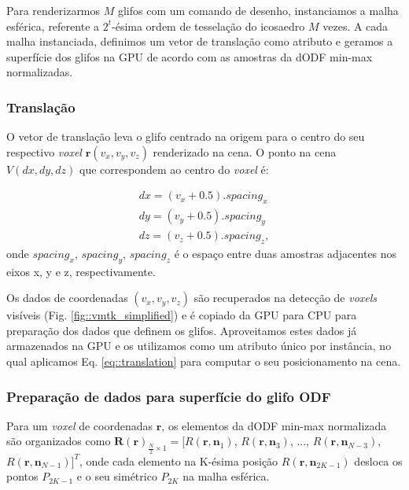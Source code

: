 Para renderizarmos $M$ glifos com um comando de desenho, instanciamos a malha esférica, referente a $2^t$-ésima ordem de tesselação do icosaedro $M$ vezes. A cada malha instanciada, definimos um vetor de translação como atributo e geramos a superfície dos glifos na GPU de acordo com as amostras da dODF min-max normalizadas.

\subsubsection{Translação}
\label{ssec::translacao}

O vetor de translação leva o glifo centrado na origem para o centro do seu respectivo \textit{voxel} $\mathbf{r}(v_x, v_y, v_z)$ renderizado na cena. O ponto na cena $V(dx, dy, dz)$ que correspondem ao centro do \textit{voxel} é:

\begin{align}
 \label{eq::translation}
    dx = (v_x + 0.5).spacing_x \nonumber\\
    dy = (v_y + 0.5).spacing_y \\
    dz = (v_z + 0.5).spacing_z \nonumber,
\end{align}
onde $spacing_x$, $spacing_y$, $spacing_z$ é o espaço entre duas amostras adjacentes nos eixos x, y e z, respectivamente.

Os dados de coordenadas $(v_x, v_y, v_z)$ são recuperados na detecção de \textit{voxels} visíveis (Fig. \ref{fig::vmtk_simplified}) e é copiado da GPU para CPU para preparação dos dados que definem os glifos. Aproveitamos estes dados já armazenados na GPU e os utilizamos como um atributo único por instância, no qual aplicamos Eq. \ref{eq::translation} para computar o seu posicionamento na cena. %

\subsubsection{Preparação de dados para superfície do glifo ODF}
\label{ssec::preparacao_de_dados}

Para um \textit{voxel} de coordenadas $\mathbf{r}$, os elementos da dODF min-max normalizada são organizados como $\boldsymbol{R}(\mathbf{r})_{\frac{N}{2} \times 1} = [
R(\mathbf{r}, \mathbf{n}_1)$,
$R(\mathbf{r}, \mathbf{n}_3)$, ...,
$R(\mathbf{r}, \mathbf{n}_{N-3})$,
$R(\mathbf{r}, \mathbf{n}_{N-1})]^T$, onde cada elemento na K-ésima posição $R(\mathbf{r}, \mathbf{n}_{2K-1})$ desloca os pontos $P_{2K-1}$ e o seu simétrico $P_{2K}$ na malha esférica.

